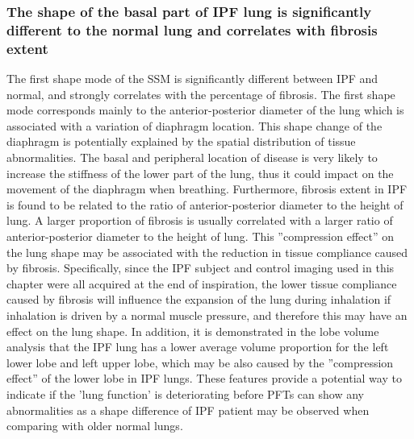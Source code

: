 \subsubsection{The shape of the basal part of IPF lung is significantly different to the normal lung and correlates with fibrosis extent}
The first shape mode of the SSM is significantly different between IPF and normal, and strongly correlates with the percentage of fibrosis. The first shape mode corresponds mainly to the anterior-posterior diameter of the lung which is associated with a variation of diaphragm location. This shape change of the diaphragm is potentially explained by the spatial distribution of tissue abnormalities. The basal and peripheral location of disease is very likely to increase the stiffness of the lower part of the lung, thus it could impact on the movement of the diaphragm when breathing. Furthermore, fibrosis extent in IPF is found to be related to the ratio of anterior-posterior diameter to the height of lung. A larger proportion of fibrosis is usually correlated with a larger ratio of anterior-posterior diameter to the height of lung. This ''compression effect'' on the lung shape may be associated with the reduction in tissue compliance caused by fibrosis. Specifically, since the IPF subject and control imaging used in this chapter were all acquired at the end of inspiration, the lower tissue compliance caused by fibrosis will influence the expansion of the lung during inhalation if inhalation is driven by a normal muscle pressure, and therefore this may have an effect on the lung shape. In addition, it is demonstrated in the lobe volume analysis that the IPF lung has a lower average volume proportion for the left lower lobe and left upper lobe, which may be also caused by the ''compression effect'' of the lower lobe in IPF lungs. These features provide a potential way to indicate if the 'lung function' is deteriorating before PFTs can show any abnormalities as a shape difference of IPF patient may be observed when comparing with older normal lungs.

